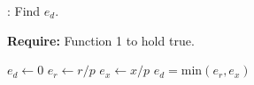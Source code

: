 \documentclass[9pt]{article}
\begin{document}
\begin{algorithm}
    \caption{: Find $e_{d}$.}
    \textbf{Require:} Function 1 to hold true.
    \begin{algorithmic}[1] %
    	\State $e_d \leftarrow 0$
    \Else
    	\State $e_r \leftarrow r/p$ 
	\State $e_x \leftarrow x/p$
	\State $e_d = \text{min}(e_r, e_x)$
    \EndIf
    \end{algorithmic}
\end{algorithm}
\end{document}
